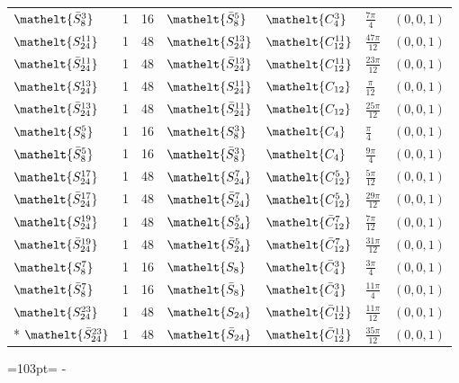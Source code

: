 \documentclass[10pt,a4paper]{article}
\newcommand{\needspace}[1]{\par\penalty-100\begingroup\dimen0=#1\relax\dimen2=\pagegoal
  \advance\dimen2-\pagetotal\ifdim\dimen0>\dimen2\relax\ifdim\dimen2>0pt\vfil\break\fi\fi
  \endgroup}
\numberwithin{equation}{section}
\newcommand{\eltfont}[1]{{\let\sigma\eltsigma\mathelt{#1}}}
\newcommand{\cls}[1]{\eltfont{#1}}
\newcommand{\dirvec}[3]{(#1, #2, #3)}
\newcommand{\barred}[1]{\bar{#1}}
\begin{document}
{\begin{longtable}{@{}lrrllll@{}}
$\cls{\barred{S}_{8}^{3}}$ & 1 & 16 & $\cls{\barred{S}_{8}^{5}}$ & $\cls{C_{4}^{3}}$ & $\tfrac{7\pi}{4}$ & $\dirvec{0}{0}{1}$\\
$\cls{S_{24}^{11}}$ & 1 & 48 & $\cls{S_{24}^{13}}$ & $\cls{C_{12}^{11}}$ & $\tfrac{47\pi}{12}$ & $\dirvec{0}{0}{1}$\\
$\cls{\barred{S}_{24}^{11}}$ & 1 & 48 & $\cls{\barred{S}_{24}^{13}}$ & $\cls{C_{12}^{11}}$ & $\tfrac{23\pi}{12}$ & $\dirvec{0}{0}{1}$\\
$\cls{S_{24}^{13}}$ & 1 & 48 & $\cls{S_{24}^{11}}$ & $\cls{C_{12}}$ & $\tfrac{\pi}{12}$ & $\dirvec{0}{0}{1}$\\
$\cls{\barred{S}_{24}^{13}}$ & 1 & 48 & $\cls{\barred{S}_{24}^{11}}$ & $\cls{C_{12}}$ & $\tfrac{25\pi}{12}$ & $\dirvec{0}{0}{1}$\\
$\cls{S_{8}^{5}}$ & 1 & 16 & $\cls{S_{8}^{3}}$ & $\cls{C_{4}}$ & $\tfrac{\pi}{4}$ & $\dirvec{0}{0}{1}$\\
$\cls{\barred{S}_{8}^{5}}$ & 1 & 16 & $\cls{\barred{S}_{8}^{3}}$ & $\cls{C_{4}}$ & $\tfrac{9\pi}{4}$ & $\dirvec{0}{0}{1}$\\
$\cls{S_{24}^{17}}$ & 1 & 48 & $\cls{S_{24}^{7}}$ & $\cls{C_{12}^{5}}$ & $\tfrac{5\pi}{12}$ & $\dirvec{0}{0}{1}$\\
$\cls{\barred{S}_{24}^{17}}$ & 1 & 48 & $\cls{\barred{S}_{24}^{7}}$ & $\cls{C_{12}^{5}}$ & $\tfrac{29\pi}{12}$ & $\dirvec{0}{0}{1}$\\
$\cls{S_{24}^{19}}$ & 1 & 48 & $\cls{S_{24}^{5}}$ & $\cls{\barred{C}_{12}^{7}}$ & $\tfrac{7\pi}{12}$ & $\dirvec{0}{0}{1}$\\
$\cls{\barred{S}_{24}^{19}}$ & 1 & 48 & $\cls{\barred{S}_{24}^{5}}$ & $\cls{\barred{C}_{12}^{7}}$ & $\tfrac{31\pi}{12}$ & $\dirvec{0}{0}{1}$\\
$\cls{S_{8}^{7}}$ & 1 & 16 & $\cls{S_{8}}$ & $\cls{\barred{C}_{4}^{3}}$ & $\tfrac{3\pi}{4}$ & $\dirvec{0}{0}{1}$\\
$\cls{\barred{S}_{8}^{7}}$ & 1 & 16 & $\cls{\barred{S}_{8}}$ & $\cls{\barred{C}_{4}^{3}}$ & $\tfrac{11\pi}{4}$ & $\dirvec{0}{0}{1}$\\
$\cls{S_{24}^{23}}$ & 1 & 48 & $\cls{S_{24}}$ & $\cls{\barred{C}_{12}^{11}}$ & $\tfrac{11\pi}{12}$ & $\dirvec{0}{0}{1}$\\*
$\cls{\barred{S}_{24}^{23}}$ & 1 & 48 & $\cls{\barred{S}_{24}}$ & $\cls{\barred{C}_{12}^{11}}$ & $\tfrac{35\pi}{12}$ & $\dirvec{0}{0}{1}$\\
\bottomrule\end{longtable}}
\needspace{103pt}
\end{document}
